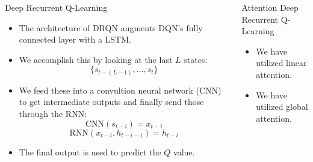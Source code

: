 \documentclass[final]{beamer}
\newlength{\onecolwid}
\newlength{\twocolwid}
\begin{document}
\begin{frame}[t]
\begin{columns}[t]
\begin{column}{\twocolwid}
\begin{columns}[t,totalwidth=\twocolwid]
\begin{column}{\onecolwid}

\begin{block}{Deep Recurrent Q-Learning}
\begin{itemize}
    \item The architecture of DRQN augments DQN's fully connected layer with a LSTM.
    \item We accomplish this by looking at the last $L$ states:
        $$ \{s_{t-(L-1)}, \dots, s_{t}\} $$
    \item We feed these into a convultion neural network (CNN) to get intermediate
        outputs and finally send those through the RNN:
        $$\text{CNN}(s_{t-i}) = x_{t-i}$$
        $$\text{RNN}(x_{t-i}, h_{t-i-1}) = h_{t-i}$$
    \item The final output is used to predict the $Q$ value.
\end{itemize}

\end{block}


\end{column} %

\begin{column}{\onecolwid}\vspace{-.6in} %


\begin{block}{Attention Deep Recurrent Q-Learning}
\begin{itemize}
        \item We have utilized linear attention.
        \item We have utilized global attention.
\end{itemize}

\end{block}

\end{column} %

\end{columns} %


\end{column}
\end{columns}
\end{frame}
\end{document}
